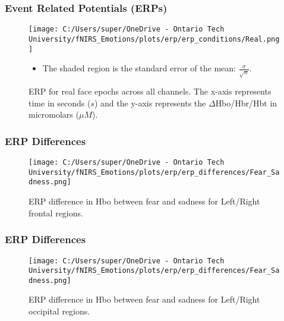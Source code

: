 \documentclass{beamer}
\begin{document}
\begin{frame}
    \frametitle{Event Related Potentials (ERPs)}
    \begin{figure}
        \texttt{[image: C:/Users/super/OneDrive - Ontario Tech University/fNIRS\_Emotions/plots/erp/erp\_conditions/Real.png]}
        \caption{ERP for real face epochs across all channels. The x-axis represents time in seconds ($s$) and the y-axis represents the $\Delta$Hbo/Hbr/Hbt in micromolars ($\mu M$).}
        \begin{itemize}
            \item The shaded region is the standard error of the mean: $\frac{\sigma}{\sqrt{n}}$. 
        \end{itemize}
    \end{figure}
\end{frame}

\begin{frame}
    \frametitle{ERP Differences}
    \begin{figure}
        \texttt{[image: C:/Users/super/OneDrive - Ontario Tech University/fNIRS\_Emotions/plots/erp/erp\_differences/Fear\_Sadness.png]}
        \caption{ERP difference in Hbo between fear and sadness for Left/Right frontal regions. }
    \end{figure}
\end{frame}

\begin{frame}
    \frametitle{ERP Differences}
    \begin{figure}
        \texttt{[image: C:/Users/super/OneDrive - Ontario Tech University/fNIRS\_Emotions/plots/erp/erp\_differences/Fear\_Sadness.png]}
        \caption{ERP difference in Hbo between fear and sadness for Left/Right occipital regions. }
    \end{figure}
\end{frame}
\end{document}
